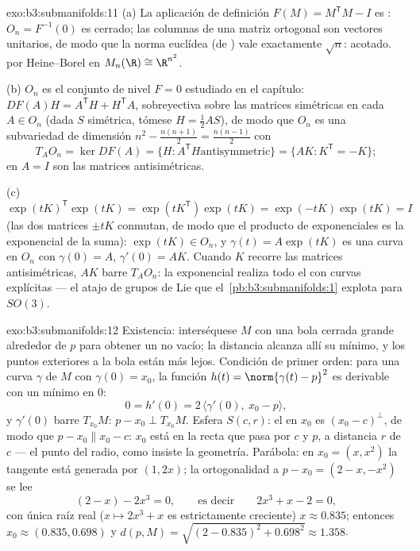 \begin{solution}{exo:b3:submanifolds:11}
(a) La aplicación de definición $F(M) = M^{\mathsf T}M - I$ es
: $O_n = F^{-1}(0)$ es
cerrado; las columnas de una matriz ortogonal son vectores unitarios, de
modo que la norma euclídea (de
) vale exactamente
$\sqrt n$: acotado.  por
Heine--Borel en $M_n(\R) \cong \R^{n^2}$.

(b) $O_n$ es el conjunto de nivel $F = 0$ estudiado en el capítulo:
$DF(A)H = A^{\mathsf T}H + H^{\mathsf T}A$, sobreyectiva sobre las
matrices simétricas en cada $A \in O_n$ (dada $S$ simétrica, tómese
$H = \frac12AS$), de modo que $O_n$ es una subvariedad de dimensión
$n^2 - \frac{n(n+1)}2 = \frac{n(n-1)}2$ con
\[
T_AO_n = \ker DF(A) = \{H : A^{\mathsf T}H \text{
antisymmetric}\} = \{AK : K^{\mathsf T} = -K\} ;
\]
en $A = I$ son las matrices antisimétricas.

(c) $\exp(tK)^{\mathsf T}\exp(tK) = \exp(tK^{\mathsf T})
\exp(tK) = \exp(-tK)\exp(tK) = I$ (las dos matrices $\pm tK$ conmutan,
de modo que el producto de exponenciales es la exponencial de la suma):
$\exp(tK) \in O_n$, y $\gamma(t) =
A\exp(tK)$ es una curva en $O_n$ con $\gamma(0) = A$, $\gamma'(0) = AK$.
Cuando $K$ recorre las matrices antisimétricas, $AK$ barre $T_AO_n$: la
exponencial realiza todo el  con curvas explícitas --- el atajo de grupos de Lie que
el~\cref{pb:b3:submanifolds:1} explota para $SO(3)$.
\end{solution}

\begin{solution}{exo:b3:submanifolds:12}
Existencia: interséquese $M$ con una bola cerrada grande alrededor de
$p$ para obtener un  no vacío;
la distancia  alcanza allí
su mínimo, y los puntos exteriores a la bola están más lejos. Condición
de primer orden: para una curva $\gamma$ de $M$ con $\gamma(0) = x_0$,
la función $h(t) = \norm{\gamma(t)
- p}^2$ es derivable con un mínimo en $0$:
\[
0 = h'(0) = 2\,\langle\gamma'(0),\ x_0 - p\rangle,
\]
y $\gamma'(0)$ barre $T_{x_0}M$: $p - x_0 \perp
T_{x_0}M$. Esfera $S(c, r)$: el
 en $x_0$ es
$(x_0 - c)^\perp$, de modo que $p - x_0 \parallel x_0 - c$: $x_0$ está
en la recta que pasa por $c$ y $p$, a distancia $r$ de $c$ --- el punto
del radio, como insiste la geometría. Parábola: en $x_0 = (x, x^2)$ la
tangente está generada por $(1, 2x)$; la ortogonalidad a
$p - x_0 = (2 - x, -x^2)$ se lee
\[
(2 - x) - 2x^3 = 0,
\qquad\text{es decir}\qquad 2x^3 + x - 2 = 0,
\]
con única raíz real ($x \mapsto 2x^3 + x$ es estrictamente creciente)
$x \approx 0.835$; entonces $x_0 \approx (0.835,
0.698)$ y $d(p, M) = \sqrt{(2 - 0.835)^2 + 0.698^2}
\approx 1.358$.
\end{solution}

